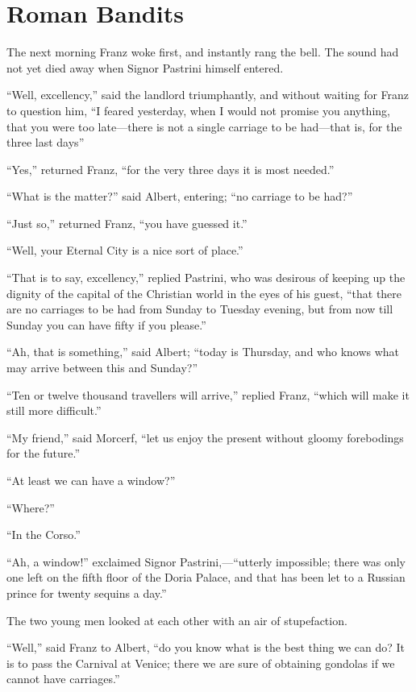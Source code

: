 \chapter{Roman Bandits}

The next morning Franz woke first, and instantly rang the bell. The
sound had not yet died away when Signor Pastrini himself entered.

“Well, excellency,” said the landlord triumphantly, and without waiting
for Franz to question him, “I feared yesterday, when I would not
promise you anything, that you were too late—there is not a single
carriage to be had—that is, for the three last days”

“Yes,” returned Franz, “for the very three days it is most needed.”

“What is the matter?” said Albert, entering; “no carriage to be had?”

“Just so,” returned Franz, “you have guessed it.”

“Well, your Eternal City is a nice sort of place.”

“That is to say, excellency,” replied Pastrini, who was desirous of
keeping up the dignity of the capital of the Christian world in the
eyes of his guest, “that there are no carriages to be had from Sunday
to Tuesday evening, but from now till Sunday you can have fifty if you
please.”

“Ah, that is something,” said Albert; “today is Thursday, and who knows
what may arrive between this and Sunday?”

“Ten or twelve thousand travellers will arrive,” replied Franz, “which
will make it still more difficult.”

“My friend,” said Morcerf, “let us enjoy the present without gloomy
forebodings for the future.”

“At least we can have a window?”

“Where?”

“In the Corso.”

“Ah, a window!” exclaimed Signor Pastrini,—“utterly impossible; there
was only one left on the fifth floor of the Doria Palace, and that has
been let to a Russian prince for twenty sequins a day.”

The two young men looked at each other with an air of stupefaction.

“Well,” said Franz to Albert, “do you know what is the best thing we
can do? It is to pass the Carnival at Venice; there we are sure of
obtaining gondolas if we cannot have carriages.”

